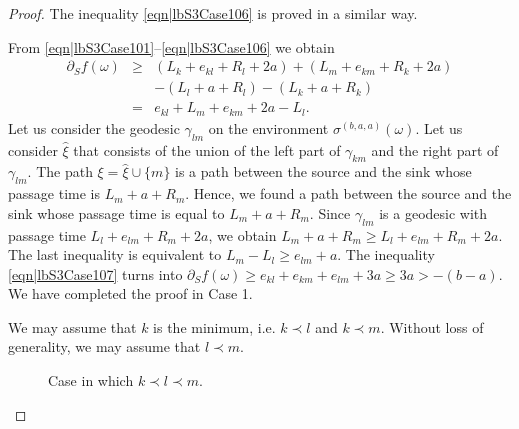 \documentclass[reqno]{amsart}
\begin{document}
\begin{proof}
The inequality \eqref{eqn|lbS3Case106} is proved in a similar way.

From \eqref{eqn|lbS3Case101}--\eqref{eqn|lbS3Case106} we obtain 
\begin{eqnarray}
\partial_Sf(\omega)&\geq& (L_k+e_{kl}+R_l+2a) + (L_m+e_{km}+R_k+2a) \nonumber\\
&&-(L_l+a+R_l)-(L_k+a+R_k) \nonumber \\
&=& e_{kl}   + L_m+e_{km}+ 2a 
-L_l. \label{eqn|lbS3Case107}
\end{eqnarray}
Let us consider the geodesic $\gamma_{lm}$ on the environment $\sigma^{(b,a,a)}(\omega)$. Let us consider $\hat \xi$ 
that consists of the union of the left part of $\gamma_{km}$ and the right part of $\gamma_{lm}$. 
The path $\xi=\hat\xi\cup\{m\}$ is a path between the source and the sink whose passage 
time is $L_m+a+R_m$.  Hence, we found a path between the source and the 
sink whose passage time is equal to $L_m+a+R_m$. Since $\gamma_{lm}$ is a geodesic with passage time 
$L_l+e_{lm}+R_m+2a$, we obtain
$L_m+a+R_m \geq L_l+e_{lm}+R_m+2a$. The last inequality is equivalent to $L_m-L_l\geq e_{lm}+a$. The inequality \eqref{eqn|lbS3Case107} turns into 
$\partial_Sf(\omega)\geq e_{kl}+e_{km}+e_{lm}+3a\geq 3a>-(b-a)$. We have completed the proof in Case 1. 

 
 We may assume that $k$ is the minimum, i.e. $k\prec l$ and $k\prec m$. Without loss of generality, we may assume that $l\prec m$. 

 \begin{figure}[t]
 \centering
{}
\caption{Case in which $k\prec l\prec m$.}
\label{fig|lowerBound3TriangleNoAlLRA}
\end{figure}


\end{proof}
\end{document}
